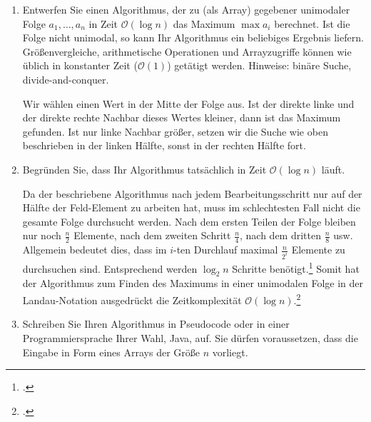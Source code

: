 \documentclass{bschlangaul-aufgabe}
\begin{document}
\begin{enumerate}


\item Entwerfen Sie einen Algorithmus, der zu (als Array) gegebener
unimodaler Folge $a_1, \dots, a_n$ in Zeit $\mathcal{O}(\log n)$ das
Maximum $\max a_i$ berechnet. Ist die Folge nicht unimodal, so kann Ihr
Algorithmus ein beliebiges Ergebnis liefern. Größenvergleiche,
arithmetische Operationen und Arrayzugriffe können wie üblich in
konstanter Zeit ($\mathcal{O}(1)$) getätigt werden. Hinweise: binäre
Suche, divide-and-conquer.

\begin{bAntwort}
Wir wählen einen Wert in der Mitte der Folge aus. Ist der direkte linke
und der direkte rechte Nachbar dieses Wertes kleiner, dann ist das
Maximum gefunden. Ist nur linke Nachbar größer, setzen wir die Suche wie
oben beschrieben in der linken Hälfte, sonst in der rechten Hälfte fort.
\end{bAntwort}


\item Begründen Sie, dass Ihr Algorithmus tatsächlich in Zeit
$\mathcal{O}(\log n)$ läuft.

\begin{bAntwort}
Da der beschriebene Algorithmus nach jedem Bearbeitungsschritt nur auf
der Hälfte der Feld-Element zu arbeiten hat, muss im schlechtesten Fall
nicht die gesamte Folge durchsucht werden. Nach dem ersten Teilen der
Folge bleiben nur noch $\frac{n}{2}$ Elemente, nach dem zweiten Schritt
$\frac{n}{4}$, nach dem dritten $\frac{n}{8}$ usw. Allgemein bedeutet
dies, dass im $i$-ten Durchlauf maximal $\frac{n}{2^i}$ Elemente zu
durchsuchen sind. Entsprechend werden $\log_2 n$ Schritte
benötigt.\footcite[Seite 122]{saake} Somit hat der Algorithmus zum
Finden des Maximums in einer unimodalen Folge in der Landau-Notation
ausgedrückt die Zeitkomplexität $\mathcal{O}(\log
n)$.\footcite{wiki:binaere-suche}
\end{bAntwort}


\item Schreiben Sie Ihren Algorithmus in Pseudocode oder in einer
Programmiersprache Ihrer Wahl, \zB Java, auf. Sie dürfen voraussetzen,
dass die Eingabe in Form eines Arrays der Größe $n$ vorliegt.

\begin{bAntwort}


\end{bAntwort}
\end{enumerate}
\end{document}
